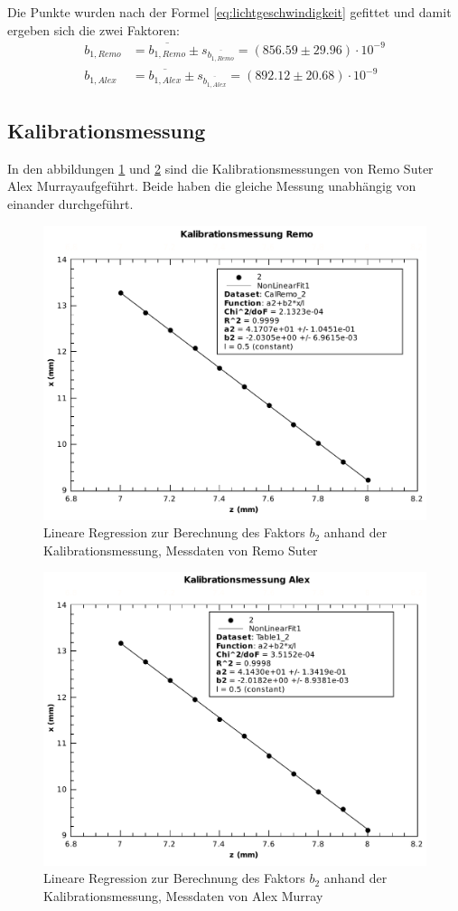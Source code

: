 Die Punkte wurden nach der Formel \ref{eq:lichtgeschwindigkeit} gefittet und damit ergeben sich  die zwei  Faktoren:
\begin{align*}
    b_{1,Remo} &= \overline{b_{1,Remo}} \pm s_{\overline{b_{1,Remo}}} = (856.59 \pm 29.96)\cdot 10^{-9} \\
    b_{1,Alex} &= \overline{b_{1,Alex}} \pm s_{\overline{b_{1,Alex}}} = (892.12 \pm 20.68)\cdot 10^{-9}
\end{align*}


\subsection{Kalibrationsmessung}

In   den  abbildungen  \ref{fig:z-x-remo}  und  \ref{fig:z-x-alex}  sind   die
Kalibrationsmessungen von Remo Suter Alex  Murrayaufgef\"uhrt. Beide haben die
gleiche Messung unabh\"angig von einander durchgef\"uhrt.

\begin{figure}[H]
    \center
    \includegraphics[width=.65\textwidth]{images/z-x-remo.pdf}
    \caption{Lineare Regression zur Berechnung des Faktors $b_2$ anhand der Kalibrationsmessung, Messdaten von Remo Suter}
    \label{fig:z-x-remo}
\end{figure}

\begin{figure}[H]
    \center
    \includegraphics[width=.65\textwidth]{images/z-x-alex.pdf}
    \caption{Lineare Regression zur Berechnung des Faktors $b_2$ anhand der Kalibrationsmessung, Messdaten von Alex Murray}
    \label{fig:z-x-alex}
\end{figure}

